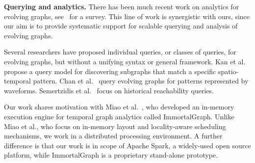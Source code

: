 {\bf Querying and analytics.} There has been much recent work on
analytics for evolving graphs,
see~\cite{DBLP:journals/csur/AggarwalS14} for a survey. This line of
work is synergistic with ours, since our aim is to provide systematic
support for scalable querying and analysis of evolving graphs.

Several researchers have proposed individual queries, or classes of
queries, for evolving graphs, but without a unifying syntax or general
framework.  Kan et al.~\cite{Kan2009} propose a query model for
discovering subgraphs that match a specific spatio-temporal pattern.
Chan et al.~\cite{Chan2008} query evolving graphs for patterns
represented by waveforms.  Semertzidis et al.~\cite{Semertzidis2015}
focus on historical reachability queries.

Our work shares motivation with Miao et
al.~\cite{DBLP:journals/tos/MiaoHLWYZPCC15}, who developed an
in-memory execution engine for temporal graph analytics called
ImmortalGraph.  Unlike Miao et al., who focus on in-memory layout and
locality-aware scheduling mechanisms, we work in a distributed
processing environment.  A further difference is that our work is in
scope of Apache Spark, a widely-used open source platform, while
ImmortalGraph is a proprietary stand-alone prototype.
